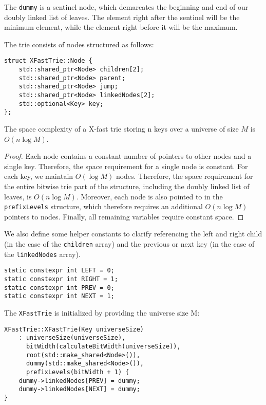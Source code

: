 The \texttt{dummy} is a sentinel node, which demarcates the beginning and end of our doubly linked list of leaves. The element right after the sentinel will be the minimum element, while the element right before it will be the maximum.

The trie consists of nodes structured as follows:

\begin{verbatim}
struct XFastTrie::Node {
    std::shared_ptr<Node> children[2];
    std::shared_ptr<Node> parent;
    std::shared_ptr<Node> jump;
    std::shared_ptr<Node> linkedNodes[2];
    std::optional<Key> key;
};
\end{verbatim}

\begin{lemma}
The space complexity of a X-fast trie storing n keys over a universe of size \( M \) is \( O(n \log M) \).
\end{lemma}

\begin{proof}
Each node contains a constant number of pointers to other nodes and a single key. Therefore, the space requirement for a single node is constant. For each key, we maintain \( O(\log M) \) nodes. Therefore, the space requirement for the entire bitwise trie part of the structure, including the doubly linked list of leaves, is \( O(n \log M) \).
Moreover, each node is also pointed to in the \texttt{prefixLevels} structure, which therefore requires an additional \( O(n \log M) \) pointers to nodes.  
Finally, all remaining variables require constant space.
\end{proof}

We also define some helper constants to clarify referencing the left and right child (in the case of the \texttt{children} array) and the previous or next key (in the case of the \texttt{linkedNodes} array).

\begin{verbatim}
static constexpr int LEFT = 0;
static constexpr int RIGHT = 1;
static constexpr int PREV = 0;
static constexpr int NEXT = 1;
\end{verbatim}

The \texttt{XFastTrie} is initialized by providing the universe size M:

\begin{verbatim}
XFastTrie::XFastTrie(Key universeSize)
    : universeSize(universeSize),
      bitWidth(calculateBitWidth(universeSize)),
      root(std::make_shared<Node>()),
      dummy(std::make_shared<Node>()),
      prefixLevels(bitWidth + 1) {
    dummy->linkedNodes[PREV] = dummy;
    dummy->linkedNodes[NEXT] = dummy;
}
\end{verbatim}


